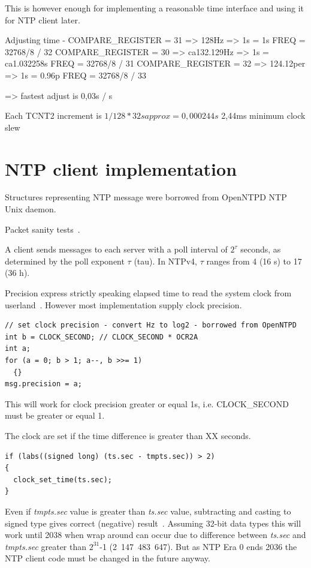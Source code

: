 
This is however enough for implementing a reasonable time interface and using it for NTP client later.



Adjusting time - COMPARE\_REGISTER = 31 => 128Hz => 1s = 1s
FREQ = 32768/8 / 32
COMPARE\_REGISTER = 30 => ca132.129Hz => 1s = ca1.032258s
FREQ = 32768/8 / 31
COMPARE\_REGISTER = 32 => 124.12per => 1s = 0.96p
FREQ = 32768/8 / 33

=> fastest adjust is 0,03s / s


Each TCNT2 increment is $1/128*32 s  approx= 0,000244 s$
2,44ms minimum clock slew



\section{NTP client implementation}
Structures representing NTP message were borrowed from OpenNTPD NTP Unix daemon.

Packet sanity tests~\cite{ntp-arch}.

A client sends messages to each server with a poll interval of $2^{\tau}$
seconds, as determined by the poll exponent $\tau$ (tau).
In NTPv4, $\tau$ ranges from 4 (16 s) to 17 (36 h).


Precision express strictly speaking elapsed time to read the system clock from userland~\cite{ntp-arch}.
However most implementation supply clock precision.
\begin{lstlisting}
// set clock precision - convert Hz to log2 - borrowed from OpenNTPD
int b = CLOCK_SECOND; // CLOCK_SECOND * OCR2A
int a;
for (a = 0; b > 1; a--, b >>= 1)
  {}
msg.precision = a;
\end{lstlisting}
This will work for clock precision greater or equal 1s, i.e. CLOCK\_SECOND must be greater or equal 1.

The clock are set if the time difference is greater than XX seconds. %
\begin{lstlisting}
if (labs((signed long) (ts.sec - tmpts.sec)) > 2)
{
  clock_set_time(ts.sec);
}
\end{lstlisting}
Even if {\it{tmpts.sec}} value is greater than {\it{ts.sec}} value,
subtracting and casting to signed type gives correct (negative) result~\cite{c99}.
Assuming 32-bit data types this will work until 2038 when wrap around can occur due to difference
between {\it{ts.sec}} and {\it{tmpts.sec}} greater than $2^{31}$-1 (2~147~483~647).
But as NTP Era 0 ends 2036 the NTP client code must be changed in the future anyway.

